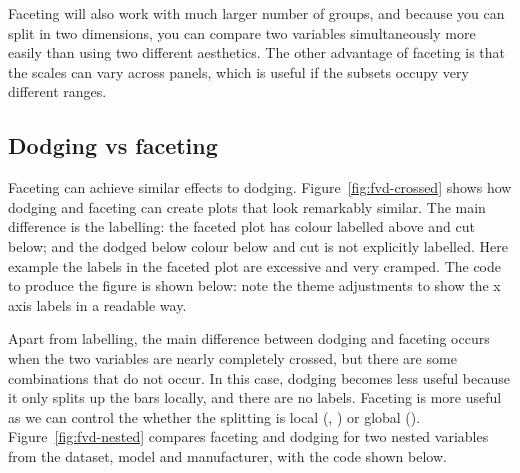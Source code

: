Faceting will also work with much larger number of groups, and because you can split in two dimensions, you can compare two variables simultaneously more easily than using two different aesthetics.  The other advantage of faceting is that the scales can vary across panels, which is useful if the subsets occupy very different ranges.


\subsection{Dodging vs faceting}
\label{sub:dodge-vs-facet}

Faceting can achieve similar effects to dodging. Figure~\ref{fig:fvd-crossed} shows how dodging and faceting can create plots that look remarkably similar. The main difference is the labelling: the faceted plot has colour labelled above and cut below; and the dodged below colour below and cut is not explicitly labelled. Here example the labels in the faceted plot are excessive and very cramped.  The code to produce the figure is shown below: note the theme adjustments to show the x axis labels in a readable way.

% 


Apart from labelling, the main difference between dodging and faceting occurs when the two variables are nearly completely crossed, but there are some combinations that do not occur.  In this case, dodging becomes less useful because it only splits up the bars locally, and there are no labels. Faceting is more useful as we can control the whether the splitting is local (, ) or global (). Figure~\ref{fig:fvd-nested} compares faceting and dodging for two nested variables from the  dataset, model and manufacturer, with the code shown below.

% 
% 



